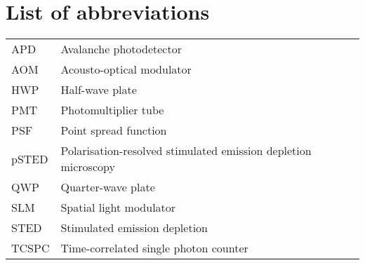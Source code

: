 \section{List of abbreviations}

\begin{tabular}{ll}
	APD   & Avalanche photodetector                                        \\
	AOM   & Acousto-optical modulator                                      \\
	HWP   & Half-wave plate                                                \\
	PMT   & Photomultiplier tube                                           \\
	PSF   & Point spread function                                          \\
	pSTED & Polarisation-resolved stimulated emission depletion microscopy \\
	QWP   & Quarter-wave plate                                             \\
	SLM   & Spatial light modulator                                        \\
	STED  & Stimulated emission depletion                                  \\
	TCSPC & Time-correlated single photon counter
\end{tabular}